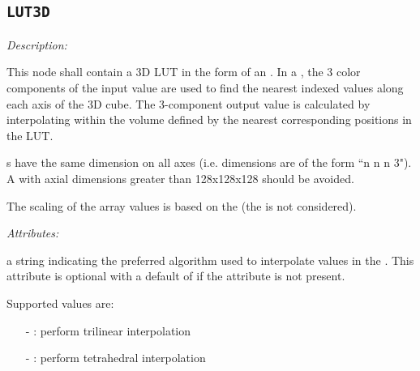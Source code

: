 \subsection{\texttt{LUT3D}}

\emph{Description:} \par
This node shall contain a 3D LUT in the form of an . In a , the 3 color components of the input value are used to find the nearest indexed values along each axis of the 3D cube. The 3-component output value is calculated by interpolating within the volume defined by the nearest corresponding positions in the LUT. 

s have the same dimension on all axes (i.e.  dimensions are of the form ``n n n 3"). A  with axial dimensions greater than 128x128x128 should be avoided.

The scaling of the array values is based on the  (the  is not considered).


\emph{Attributes:}
\begin{xmlfields}
    \xmlitem[interpolation][optional] a string indicating the preferred algorithm used to interpolate values in the . This attribute is optional with a default of  if the attribute is not present. \par   Supported values are: 
        \begin{itemize}
            \item[-] : perform trilinear interpolation
            
            \item[-] : perform tetrahedral interpolation
        \end{itemize}
\end{xmlfields}

